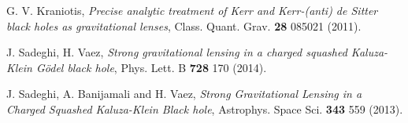 \documentclass[aps,showpacs,preprintnumbers,amsmath,amssymb]{revtex4}
\begin{document}
\begin{thebibliography}{99}
 G. V. Kraniotis, \textit{Precise analytic treatment of Kerr and Kerr-(anti) de Sitter black holes as gravitational lenses}, Class. Quant. Grav. {\bf28}  085021 (2011).


 J. Sadeghi, H. Vaez, \textit{Strong gravitational lensing in a charged squashed Kaluza-Klein G\"{o}del black hole}, Phys. Lett. B {\bf728}  170 (2014).

 J. Sadeghi, A. Banijamali and H. Vaez, \textit{Strong Gravitational Lensing in a Charged Squashed Kaluza-Klein Black hole}, Astrophys. Space Sci. {\bf343}  559 (2013).






\end{thebibliography}
\end{document}
